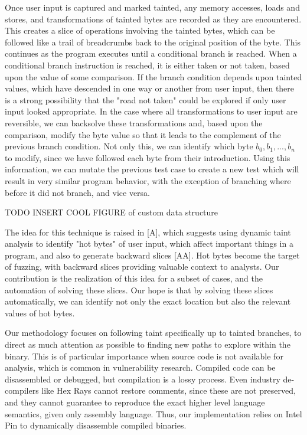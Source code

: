 \documentclass[11pt,expanded,copyright]{fsuthesis}
\begin{document}
Once user input is captured and marked tainted, any memory accesses, loads and stores, and transformations of tainted bytes are recorded as they are encountered. This creates a slice of operations involving the tainted bytes, which can be followed like a trail of breadcrumbs back to the original position of the byte. This continues as the program executes until a conditional branch is reached. When a conditional branch instruction is reached, it is either taken or not taken, based upon the value of some comparison. If the branch condition depends upon tainted values, which have descended in one way or another from user input, then there is a strong possibility that the "road not taken" could be explored if only user input looked appropriate. In the case where all transformations to user input are reversible, we can backsolve these transformations and, based upon the comparison, modify the byte value so that it leads to the complement of the previous branch condition. Not only this, we can identify which byte $b_0,b_1,...,b_n$ to modify, since we have followed each byte from their introduction. Using this information, we can mutate the previous test case to create a new test which will result in very similar program behavior, with the exception of branching where before it did not branch, and vice versa.

TODO INSERT COOL FIGURE of custom data structure

The idea for this technique is raised in [A], which suggests using dynamic taint analysis to identify "hot bytes" of user input, which affect important things in a program, and also to generate backward slices [AA]. Hot bytes become the target of fuzzing, with backward slices providing valuable context to analysts. Our contribution is the realization of this idea for a subset of cases, and the automation of solving these slices. Our hope is that by solving these slices automatically, we can identify not only the exact location but also the relevant values of hot bytes. 

Our methodology focuses on following taint specifically up to tainted branches, to direct as much attention as possible to finding new paths to explore within the binary. This is of particular importance when source code is not available for analysis, which is common in vulnerability research. Compiled code can be disassembled or debugged, but compilation is a lossy process. Even industry de-compilers like Hex Rays cannot restore comments, since these are not preserved, and they cannot guarantee to reproduce the exact higher level language semantics, given only assembly language. Thus, our implementation relies on Intel Pin to dynamically disassemble compiled binaries.
\end{document}
